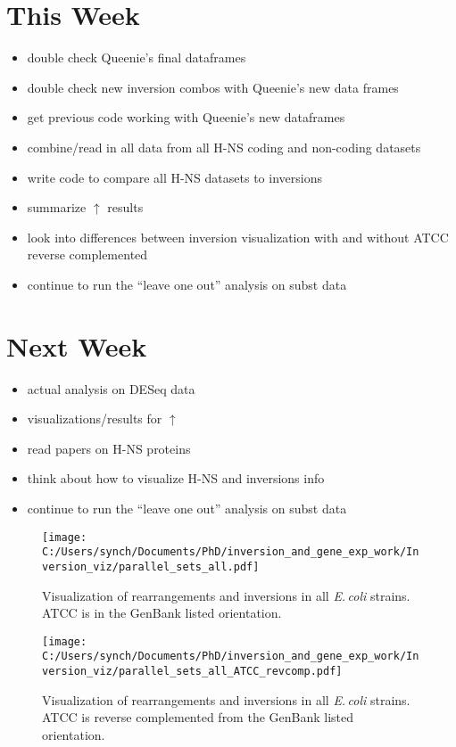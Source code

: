 \documentclass[12pt]{article}
\newcommand{\ecol}{\textit{E.\,coli}\xspace}
\begin{document}
\section*{This Week}
%
\begin{itemize}
	\item double check Queenie's final dataframes 
	\item double check new inversion combos with Queenie's new data frames
\item get previous code working with Queenie's new dataframes
\item combine/read in all data from all H-NS coding and non-coding datasets
\item write code to compare all H-NS datasets to inversions 
\item summarize $\uparrow$ results
\item look into differences between inversion visualization with and without ATCC reverse complemented
\item continue to run the ``leave one out'' analysis on subst data

\end{itemize}


\section*{Next Week}
\begin{itemize}
	\item actual analysis on DESeq data
	\item visualizations/results for $\uparrow$
	\item read papers on H-NS proteins
	\item think about how to visualize H-NS and inversions info
	
	\item continue to run the ``leave one out'' analysis on subst data
\end{itemize}

\newpage

\begin{figure}
	\texttt{[image: C:/Users/synch/Documents/PhD/inversion\_and\_gene\_exp\_work/Inversion\_viz/parallel\_sets\_all.pdf]}
	\caption{\label{fig:inversion_norevcomp} Visualization of rearrangements and inversions in all \ecol strains. ATCC is in the GenBank listed orientation.}
\end{figure}

\begin{figure}
	\texttt{[image: C:/Users/synch/Documents/PhD/inversion\_and\_gene\_exp\_work/Inversion\_viz/parallel\_sets\_all\_ATCC\_revcomp.pdf]}
	\caption{\label{fig:inversion_revcomp} Visualization of rearrangements and inversions in all \ecol strains. ATCC is reverse complemented from the GenBank listed orientation.}
\end{figure}
\end{document}

